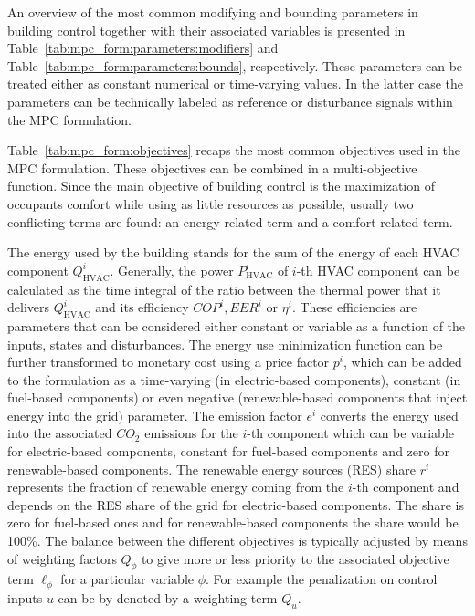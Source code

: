 \documentclass[10pt]{extarticle}
\begin{document}
An overview of the most common modifying and bounding parameters in building control together with their associated variables is presented in Table~\ref{tab:mpc_form:parameters:modifiers} and Table~\ref{tab:mpc_form:parameters:bounds}, respectively.
These parameters can be treated either as constant numerical  or time-varying values. In the latter case the parameters can be technically labeled as reference or disturbance signals within the MPC formulation.

Table~\ref{tab:mpc_form:objectives} recaps the most common objectives used 
in the MPC formulation. These objectives can be combined in a multi-objective
function. Since the main objective of building control is the maximization of occupants comfort while using as little resources as possible,
usually two conflicting terms are found: an energy-related term
and a comfort-related term.   
 
The energy used by the building stands for the sum of the energy of each
HVAC component $Q^i_{\text{HVAC}}$.
Generally, the power $P^i_{\text{HVAC}}$ of $i$-th HVAC component can be calculated as the time integral of the
ratio between the thermal power that it delivers $Q^i_{\text{HVAC}}$ and its efficiency $COP^i, EER^i$ or $\eta^i$. 
These efficiencies are parameters that can be considered either constant or variable
as a function of the inputs, states and disturbances.
The energy use
minimization function can be further transformed to monetary cost  using a price factor  $p^i$, which can be added to the formulation 
as a time-varying (in electric-based components), constant (in fuel-based components) or even negative 
(renewable-based components that inject energy into the grid) parameter.
The emission factor $e^i$ converts the energy used into the associated $CO_2$ emissions 
for the $i$-th component which can be variable for electric-based components,
constant for fuel-based components and zero for renewable-based components.
The renewable energy sources (RES) share $r^i$ represents the fraction of renewable
energy coming from the  $i$-th component and depends on the RES share of the grid for
electric-based components. The share is zero for fuel-based ones and for
renewable-based components the share would be 100\%.
% 
The balance between the different objectives is typically adjusted
by means of weighting factors $Q_{\phi}$ to give more or less priority to the associated objective term $\ell_{\phi}$ for a particular variable $\phi$. For example the penalization on control inputs $u$ can be by denoted by a weighting term $Q_{u}$.
\end{document}
